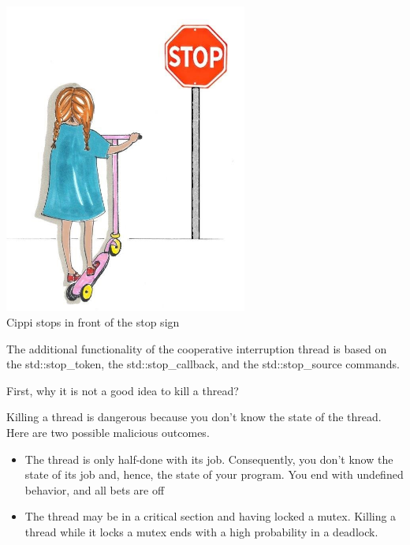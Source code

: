 \begin{center}
\includegraphics[width=0.6\textwidth]{content/3/chapter6/images/22.png}\\
Cippi stops in front of the stop sign
\end{center}

The additional functionality of the cooperative interruption thread is based on the std::stop\_token, the std::stop\_callback, and the std::stop\_source commands.

First, why it is not a good idea to kill a thread?

\begin{tcolorbox}[breakable,enhanced jigsaw,colback=red!5!white,colframe=red!75!black,title={Killing a Thread is Dangerous}]
	
Killing a thread is dangerous because you don’t know the state of the thread. Here are two possible malicious outcomes.

\begin{itemize}
\item 
The thread is only half-done with its job. Consequently, you don’t know the state of its job and, hence, the state of your program. You end with undefined behavior, and all bets are off

\item 
The thread may be in a critical section and having locked a mutex. Killing a thread while it locks a mutex ends with a high probability in a deadlock.
\end{itemize}
\end{tcolorbox}


